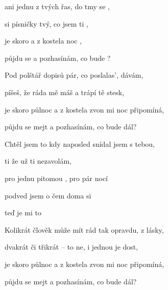 

\zs
{}ani jednu z tvých řas, do tmy se ,

 si písničky tvý, co jsem ti ,

je skoro  a z kostela  noc ,

půjdu se  a pozhasínám, co bude ?
\ks

\zs
Pod polštář dopisů pár, co poslalas', dávám,

píšeš, že ráda mě máš a trápí tě stesk,

je skoro půlnoc a z kostela zvon mi noc připomíná,

půjdu se mejt a pozhasínám, co bude dál?
\ks

\zr
Chtěl jsem to  kdy naposled snídal jsem s tebou,

ti  že už ti nezavolám,

pro jednu pitomou , pro pár nocí 

podved jsem  o čem doma si 

teď je mi to 
\kr

\zs
Kolikrát člověk může mít rád tak opravdu, z lásky,

dvakrát či třikrát -- to ne, i jednou je dost,

je skoro půlnoc a z kostela zvon mi noc připomíná,

půjdu se mejt a pozhasínám, co bude dál?
\ks


\zr \kr

\kp






